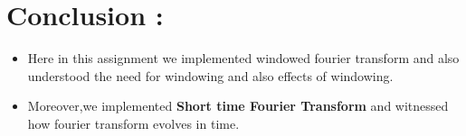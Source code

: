 \documentclass[11pt, a4paper]{article}
\begin{document}
	

	
		
    \section{Conclusion :}\label{conclusion}

\begin{itemize}

\item
  Here in this assignment we implemented windowed fourier transform and
  also understood the need for windowing and also effects of windowing.
\item
  Moreover,we implemented \textbf{Short time Fourier Transform} and
  witnessed how fourier transform evolves in time.
\end{itemize}

	
\end{document}
